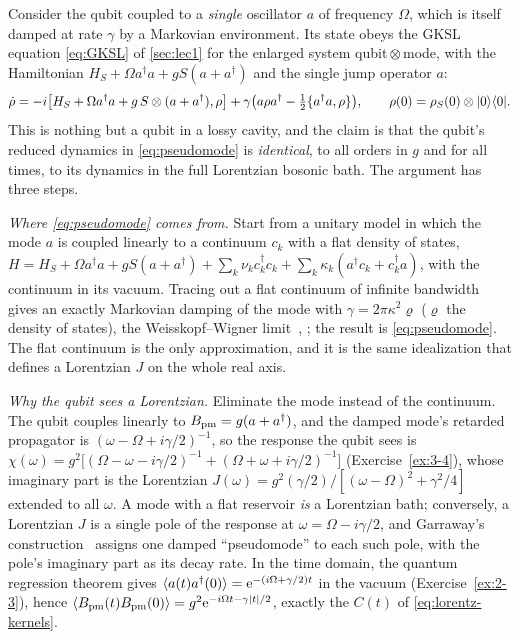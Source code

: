 \begin{keybox}
Consider the qubit coupled to a \emph{single} oscillator $a$ of frequency $\Omega$, which is itself damped at rate $\gamma$ by a Markovian environment.
Its state obeys the GKSL equation \eqref{eq:GKSL} of \cref{sec:lec1} for the enlarged system qubit\,$\otimes$\,mode, with the Hamiltonian $H_S+\Omega a^\dagger a+gS(a+a^\dagger)$ and the single jump operator $a$:
\begin{equation}
  \dot\rho=-i\big[H_S+\Omega a^\dagger a+g\,S\otimes(a+a^\dagger),\rho\big]
  +\gamma\big(a\rho a^\dagger-\tfrac12\{a^\dagger a,\rho\}\big),\qquad \rho(0)=\rho_{S}(0)\otimes|0\rangle\langle0| .
  \label{eq:pseudomode}
\end{equation}
This is nothing but a qubit in a lossy cavity, and the claim is that the qubit's reduced dynamics in \cref{eq:pseudomode} is \emph{identical}, to all orders in $g$ and for all times, to its dynamics in the full Lorentzian bosonic bath.
The argument has three steps.

\emph{Where \cref{eq:pseudomode} comes from.}
Start from a unitary model in which the mode $a$ is coupled linearly to a continuum $c_k$ with a flat density of states, $H=H_S+\Omega a^\dagger a+gS(a+a^\dagger)+\sum_k\nu_kc_k^\dagger c_k+\sum_k\kappa_k(a^\dagger c_k+c_k^\dagger a)$, with the continuum in its vacuum.
Tracing out a flat continuum of infinite bandwidth gives an exactly Markovian damping of the mode with $\gamma=2\pi\kappa^2\varrho$ ($\varrho$ the density of states), the Weisskopf--Wigner limit~\cite[Ch.~3]{Gardiner2004}, \cite[Sec.~3.4]{BreuerPetruccione}; the result is \cref{eq:pseudomode}.
The flat continuum is the only approximation, and it is the same idealization that defines a Lorentzian $J$ on the whole real axis.

\emph{Why the qubit sees a Lorentzian.}
Eliminate the mode instead of the continuum.
The qubit couples linearly to $B_{\rm pm}=g(a+a^\dagger)$, and the damped mode's retarded propagator is $(\omega-\Omega+i\gamma/2)^{-1}$, so the response the qubit sees is $\chi(\omega)=g^2\big[(\Omega-\omega-i\gamma/2)^{-1}+(\Omega+\omega+i\gamma/2)^{-1}\big]$ (Exercise~\ref{ex:3-4}), whose imaginary part is the Lorentzian $J(\omega)=g^2(\gamma/2)/[(\omega-\Omega)^2+\gamma^2/4]$ extended to all $\omega$.
A mode with a flat reservoir \emph{is} a Lorentzian bath; conversely, a Lorentzian $J$ is a single pole of the response at $\omega=\Omega-i\gamma/2$, and Garraway's construction~\cite{Garraway1997} assigns one damped ``pseudomode'' to each such pole, with the pole's imaginary part as its decay rate.
In the time domain, the quantum regression theorem gives $\langle a(t)a^\dagger(0)\rangle=\mathrm{e}^{-(i\Omega+\gamma/2)t}$ in the vacuum (Exercise~\ref{ex:2-3}), hence $\langle B_{\rm pm}(t)B_{\rm pm}(0)\rangle=g^2\mathrm{e}^{-i\Omega t-\gamma|t|/2}$, exactly the $C(t)$ of \cref{eq:lorentz-kernels}.


\end{keybox}

